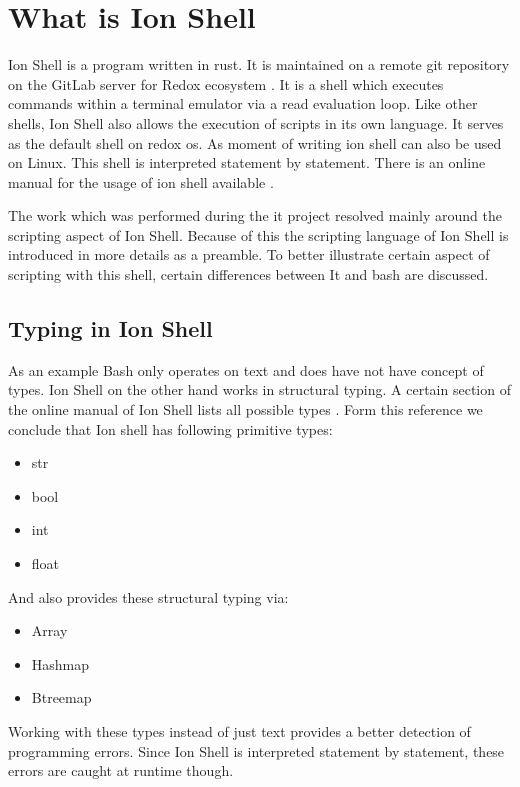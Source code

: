 \chapter{What is Ion Shell}\label{ch:intro}

Ion Shell is a program written in rust.
It is maintained on a remote git repository on the GitLab server for Redox ecosystem \cite{ion_shell}.
It is a shell which executes commands within a terminal emulator via a read evaluation loop.
Like other shells, Ion Shell also allows the execution of scripts in its own language.
It serves as the default shell on redox os.
As moment of writing ion shell can also be used on Linux.
This shell is interpreted statement by statement.
There is an online manual for the usage of ion shell available \cite{ion_shell_online_manual}.

The work which was performed during the it project resolved mainly around the scripting aspect of Ion Shell.
Because of this the scripting language of Ion Shell is introduced in more details as a preamble.
To better illustrate certain aspect of scripting with this shell, certain differences between It and bash are discussed.

\section{Typing in Ion Shell}

As an example Bash only operates on text and does have not have concept of types.
Ion Shell on the other hand works in structural typing.
A certain section of the online manual of Ion Shell lists all possible types \cite{ion_shell_types}.
Form this reference we conclude that Ion shell has following primitive types:

\begin{itemize}
	\item str
	\item bool
	\item int
	\item float
\end{itemize}

And also provides these structural typing via:

\begin{itemize}
	\item Array
	\item Hashmap
	\item Btreemap
\end{itemize}

Working with these types instead of just text provides a better detection of programming errors.
Since Ion Shell is interpreted statement by statement, these errors are caught at runtime though.

